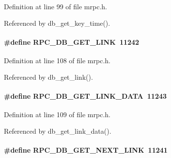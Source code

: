 Definition at line 99 of file mrpc.h.

Referenced by db\_\-get\_\-key\_\-time().
\paragraph[{RPC\_\-DB\_\-GET\_\-LINK}]{\setlength{\rightskip}{0pt plus 5cm}\#define RPC\_\-DB\_\-GET\_\-LINK~11242}\hfill\label{group__mrpcdefineh_ga85c75377ece6e2281233e853ec3292bf}

\begin{DoxyItemize}
\item 
\end{DoxyItemize}

Definition at line 108 of file mrpc.h.

Referenced by db\_\-get\_\-link().
\paragraph[{RPC\_\-DB\_\-GET\_\-LINK\_\-DATA}]{\setlength{\rightskip}{0pt plus 5cm}\#define RPC\_\-DB\_\-GET\_\-LINK\_\-DATA~11243}\hfill\label{group__mrpcdefineh_ga9836d58a3935ec9af877ac4f44ed471c}

\begin{DoxyItemize}
\item 
\end{DoxyItemize}

Definition at line 109 of file mrpc.h.

Referenced by db\_\-get\_\-link\_\-data().
\paragraph[{RPC\_\-DB\_\-GET\_\-NEXT\_\-LINK}]{\setlength{\rightskip}{0pt plus 5cm}\#define RPC\_\-DB\_\-GET\_\-NEXT\_\-LINK~11241}\hfill\label{group__mrpcdefineh_ga71d74e83676cb772050c47235465b5f5}

\begin{DoxyItemize}
\item 
\end{DoxyItemize}

